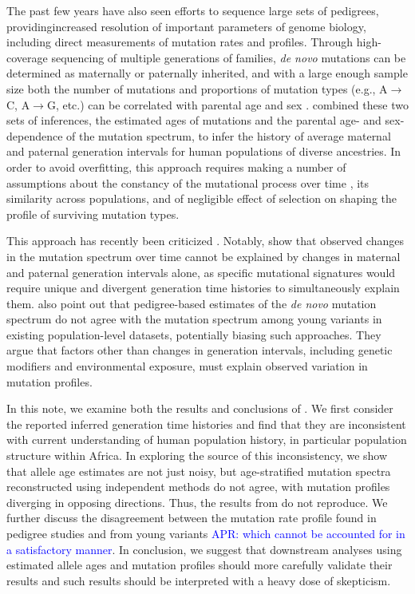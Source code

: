 \documentclass[]{article}
\newcommand{\aprcomment}[1]{{\textcolor{blue}{APR: #1}}}
\begin{document}
The past few years have also seen efforts to sequence large sets of pedigrees,
providingincreased resolution of important parameters of genome biology,
including direct measurements of mutation rates and profiles. Through
high-coverage sequencing of multiple generations of families, \emph{de novo}
mutations can be determined as maternally or paternally inherited, and with a
large enough sample size both the number of mutations and proportions of
mutation types (e.g., A$\rightarrow$C, A$\rightarrow$G, etc.) can be correlated
with parental age and sex
\citep{jonsson2017parental,halldorsson2019characterizing}.
\citet{wang2023human} combined these two sets of inferences, the estimated ages
of mutations and the parental age- and sex-dependence of the mutation spectrum,
to infer the history of average maternal and paternal generation intervals for
human populations of diverse ancestries. In order to avoid overfitting, this
approach requires making a number of assumptions about the constancy of the
mutational process over time \cite{harris,dewitt}, its similarity across
populations, and of negligible effect of selection on shaping the profile of
surviving mutation types.

This approach has recently been criticized \citep{gao2022limited}. Notably,
\citet{gao2022limited} show that observed changes in the mutation spectrum over
time cannot be explained by changes in maternal and paternal generation
intervals alone, as specific mutational signatures would require unique and
divergent generation time histories to simultaneously explain them.
\citet{gao2022limited} also point out that pedigree-based estimates of the
\emph{de novo} mutation spectrum do not agree with the mutation spectrum among
young variants in existing population-level datasets, potentially biasing such
approaches. They argue that factors other than changes in generation intervals,
including genetic modifiers and environmental exposure, must explain observed
variation in mutation profiles.

In this note, we examine both the results and conclusions of
\citet{wang2023human}. We first consider the reported inferred generation time
histories and find that they are inconsistent with current understanding of
human population history, in particular population structure within Africa. In
exploring the source of this inconsistency, we show that allele age estimates
are not just noisy, but age-stratified mutation spectra reconstructed using
independent methods do not agree, with mutation profiles diverging in opposing
directions. Thus, the results from \citet{wang2023human} do not reproduce. We
further discuss the disagreement between the mutation rate profile found in
pedigree studies and from young variants \aprcomment{which cannot be
accounted for in a satisfactory manner}. In conclusion, we suggest that
downstream analyses using estimated allele ages and mutation profiles should
more carefully validate their results and such results should be interpreted
with a heavy dose of skepticism.
\end{document}
